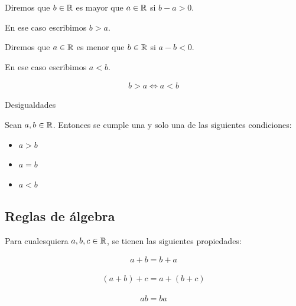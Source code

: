 
 Diremos que $b\in \mathbb{R}$ es mayor que $a\in\mathbb{R}$ si $b-a>0$. 
  
 
 En ese caso escribimos $b>a$.

{}
	Diremos que $a\in \mathbb{R}$ es menor que  $b\in\mathbb{R}$ si $a-b<0$.
	
	En ese caso escribimos $a<b$.

{}
	\begin{prop}
		\begin{align*}
		b>a \iff a<b	
		\end{align*}
	\end{prop}

{Desigualdades}
	\begin{prop}
		Sean $a,b\in\mathbb{R}$. Entonces se cumple una y solo una de las siguientes condiciones:
		\begin{itemize}
			\item $a>b$
			\item $a=b$
			\item $a<b$
		\end{itemize}
	\end{prop}

\subsection{Reglas de álgebra}

	Para cualesquiera $a,b,c\in\mathbb{R}$, se tienen las siguientes propiedades:

{}
	\begin{axiom}
		\label{axiom--1}
		\begin{align}
		a+b=b+a
		\end{align}
	\end{axiom}

{}
	\begin{axiom}
		\label{axiom--2}
		\begin{align}
	(a+b)+c = a+(b+c)
		\end{align}
	\end{axiom}

{}
	\begin{axiom}
		\label{axiom--3}
		\begin{align}
		ab=ba
		\end{align}
	\end{axiom}

